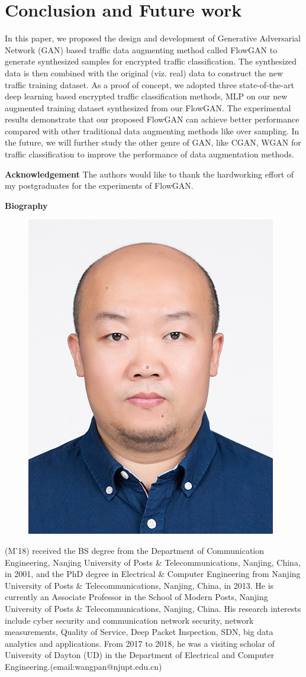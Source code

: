 \documentclass[letterpaper,12pt]{article}
\begin{document}
\section{Conclusion and Future work}
In this paper, we proposed the design and development of Generative Adversarial Network (GAN) based traffic data augmenting method called FlowGAN to generate synthesized samples for encrypted traffic classification. The synthesized data is then combined with the original (viz. real) data to construct the new traffic training dataset. As a proof of concept, we adopted three state-of-the-art deep learning based encrypted traffic classification methods, MLP on our new augmented training dataset synthesized from our FlowGAN. The experimental results demonstrate that our proposed FlowGAN can achieve better performance compared with  other traditional data augmenting methods like over sampling. In the future, we will further study the other genre of GAN, like CGAN, WGAN for traffic classification to improve the performance of data augmentation methods.


\vspace{2ex}
\noindent
{\bf\normalsize Acknowledgement}\newline
{The authors would like to thank the hardworking effort of my postgraduates for the experiments of FlowGAN.}

\renewcommand\refname{Reference}



%
%
\noindent
{\bf\normalsize Biography}


\begin{figure}[ht!]
	\includegraphics[width=1 in]{figures/wp} 
\end{figure}

 (M'18) received the BS degree from the Department of Communication Engineering, Nanjing University of Posts \& Telecommunications, Nanjing, China, in 2001, and the PhD degree in Electrical \& Computer Engineering from Nanjing University of Posts \& Telecommunications, Nanjing, China, in 2013. He is currently an Associate Professor in the School of Modern Posts, Nanjing University of Posts \& Telecommunications, Nanjing, China. His research interests include cyber security and communication network security, network measurements, Quality of Service, Deep Packet Inspection, SDN, big data analytics and applications. From 2017 to 2018, he was a visiting scholar of University of Dayton (UD) in the Department of Electrical and Computer Engineering.(email:wangpan@njupt.edu.cn)
\end{document}
